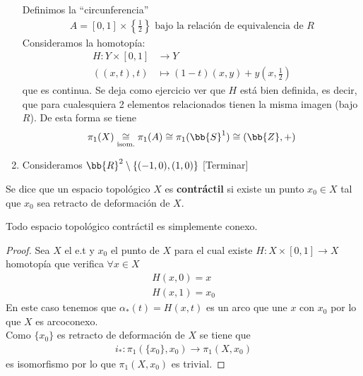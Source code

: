 \begin{ejemplo}
\begin{enumerate}
        Definimos la ``circunferencia''
        \begin{gather*}
            A = [0,1]\times \left\{ \frac{1}{2} \right\} \text{ bajo la relación de equivalencia de }R
        \end{gather*}
        Consideramos la homotopía:
        \begin{align*}
            H:Y\times [0,1] &\to Y\\
            ((x,t),t) &\mapsto (1-t)(x,y)+y\left(x, \frac{1}{2}\right)
        \end{align*}
        que es continua. Se deja como ejercicio ver que $H$ está bien definida, es decir, que para cualesquiera 2 elementos relacionados tienen la misma imagen (bajo $R$). De esta forma se tiene
        \begin{gather*}
            \pi_1(X) \underset{\text{isom.}}{\cong} \pi_1(A) \cong \pi_1(\bb{S}^1)\cong (\bb{Z},+)
        \end{gather*}

        \item Consideramos $\bb{R}^2 \setminus\{(-1,0),(1,0)\}$ [Terminar]
        
    \end{enumerate}
\end{ejemplo}

\begin{definicion}
    Se dice que un espacio topológico $X$ es \textbf{contráctil} si existe un punto $x_0\in X$ tal que $x_0$ sea retracto de deformación de $X$.
\end{definicion}

\begin{coro}
    Todo espacio topológico contráctil es simplemente conexo.
    \begin{proof}
        Sea $X$ el e.t y $x_0$ el punto de $X$ para el cual existe $H:X\times[0,1] \to X$ homotopía que verifica $\forall x \in X$
        \begin{gather*}
            H(x,0) = x\\
            H(x,1) = x_0
        \end{gather*}
        En este caso tenemos que $\alpha_*(t)=H(x,t)$ es un arco que une $x$ con $x_0$ por lo que $X$ es arcoconexo.\\

        Como $\{x_0\}$ es retracto de deformación de $X$ se tiene que 
        \begin{gather*}
            i_*:\pi_1(\{x_0\},x_0) \to \pi_1(X,x_0)
        \end{gather*}
        es isomorfismo por lo que $\pi_1(X,x_0)$ es trivial.
    \end{proof}
\end{coro}

